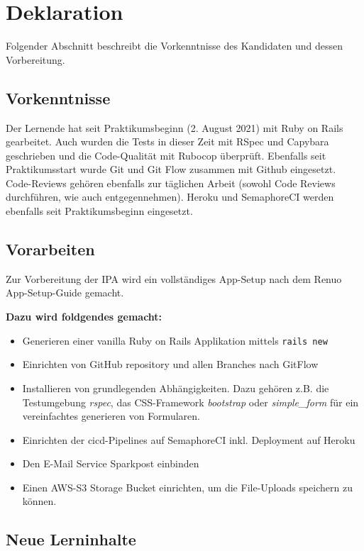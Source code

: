 \chapter{Deklaration}

Folgender Abschnitt beschreibt die Vorkenntnisse des Kandidaten und dessen Vorbereitung.

\section{Vorkenntnisse}

Der Lernende hat seit Praktikumsbeginn (2. August 2021) mit Ruby on Rails gearbeitet. Auch wurden die Tests in dieser Zeit mit RSpec und Capybara geschrieben und die Code-Qualität mit Rubocop überprüft.
Ebenfalls seit Praktikumsstart wurde Git und Git Flow zusammen mit Github eingesetzt. Code-Reviews gehören ebenfalls zur täglichen Arbeit (sowohl Code Reviews durchführen, wie auch entgegennehmen).
Heroku und SemaphoreCI werden ebenfalls seit Praktikumsbeginn eingesetzt.

\section{Vorarbeiten}

Zur Vorbereitung der IPA wird ein vollständiges App-Setup nach dem Renuo App-Setup-Guide gemacht.

\textbf{Dazu wird foldgendes gemacht:}
\begin{itemize}
    \item Generieren einer vanilla Ruby on Rails Applikation mittels \texttt{rails new}
    \item Einrichten von GitHub repository und allen Branches nach GitFlow
    \item Installieren von grundlegenden Abhängigkeiten. Dazu gehören z.B. die Testumgebung \emph{rspec},
          das CSS-Framework \emph{bootstrap} oder \emph{simple\_form} für ein vereinfachtes generieren von Formularen.
    \item Einrichten der \gls{cicd}-Pipelines auf SemaphoreCI inkl. Deployment auf Heroku
    \item Den E-Mail Service Sparkpost einbinden
    \item Einen AWS-S3 Storage Bucket einrichten, um die File-Uploads speichern zu können.
\end{itemize}

\section{Neue Lerninhalte}

